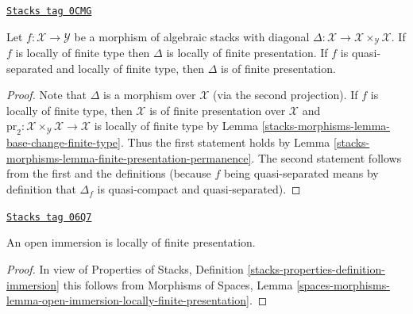 \begin{lemma}
\label{stacks-morphisms-lemma-diagonal-morphism-finite-type}
\href{https://stacks.math.columbia.edu/tag/0CMG}{\texttt{Stacks tag 0CMG}}

Let $f : \mathcal{X} \to \mathcal{Y}$ be a morphism of algebraic stacks
with diagonal
$\Delta : \mathcal{X} \to \mathcal{X} \times_\mathcal{Y} \mathcal{X}$.
If $f$ is locally of finite type then $\Delta$ is
locally of finite presentation. If $f$ is
quasi-separated and locally of finite type, then $\Delta$ is of finite
presentation.
\end{lemma}

\begin{proof}
Note that $\Delta$ is a morphism over $\mathcal{X}$ (via the second
projection). If $f$ is locally of finite type, then
$\mathcal{X}$ is of finite presentation over $\mathcal{X}$ and
$\text{pr}_2 : \mathcal{X} \times_\mathcal{Y} \mathcal{X} \to \mathcal{X}$
is locally of finite type by Lemma \ref{stacks-morphisms-lemma-base-change-finite-type}.
Thus the first statement holds by
Lemma \ref{stacks-morphisms-lemma-finite-presentation-permanence}.
The second statement follows from the first and
the definitions (because $f$ being quasi-separated means
by definition that $\Delta_f$ is quasi-compact and quasi-separated).
\end{proof}

\begin{lemma}
\label{stacks-morphisms-lemma-open-immersion-locally-finite-presentation}
\href{https://stacks.math.columbia.edu/tag/06Q7}{\texttt{Stacks tag 06Q7}}

An open immersion is locally of finite presentation.
\end{lemma}

\begin{proof}
In view of Properties of Stacks, Definition
\ref{stacks-properties-definition-immersion}
this follows from
Morphisms of Spaces,
Lemma \ref{spaces-morphisms-lemma-open-immersion-locally-finite-presentation}.
\end{proof}

